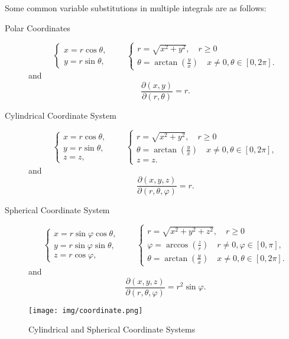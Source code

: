 \documentclass[11pt]{../../TexTemplate/elegantbook}
\begin{document}
\vspace{0.7cm}
Some common variable substitutions in multiple integrals are as follows:
\begin{description}
\item[Polar Coordinates]
\[
\begin{cases} 
    x = r \cos \theta, \\ 
    y = r \sin \theta,
\end{cases}
\qquad
\begin{cases} 
    r = \sqrt{x^2 + y^2},\quad r\geqslant 0 \\ 
    \theta = \arctan\left(\frac{y}{x}\right)\quad x\neq 0, \theta\in [0, 2\pi].
\end{cases}
\]
and
\[
\frac{\partial (x,y)}{\partial (r,\theta)} = r.
\]

\item[Cylindrical Coordinate System]
\[
\begin{cases} 
    x = r \cos \theta, \\ 
    y = r \sin \theta, \\
    z = z,
\end{cases}
\qquad
\begin{cases} 
    r = \sqrt{x^2 + y^2},\quad r\geqslant 0 \\ 
    \theta = \arctan\left(\frac{y}{x}\right)\quad x\neq 0, \theta\in [0, 2\pi], \\
    z = z.
\end{cases}
\]
and
\[
\frac{\partial (x,y,z)}{\partial (r,\theta,\varphi)} = r.
\]

\item[Spherical Coordinate System]
\[
\begin{cases} 
    x = r \sin \varphi \cos \theta, \\ 
    y = r \sin \varphi \sin \theta, \\
    z = r \cos \varphi,
\end{cases}
\qquad
\begin{cases} 
    r = \sqrt{x^2 + y^2 + z^2},\quad r\geqslant 0 \\ 
    \varphi = \arccos\left(\frac{z}{r}\right)\quad r\neq 0, \varphi\in [0, \pi], \\
    \theta = \arctan\left(\frac{y}{x}\right)\quad x\neq 0, \theta\in [0, 2\pi].
\end{cases}
\]
and
\[
\frac{\partial (x,y,z)}{\partial (r,\theta,\varphi)} = r^2 \sin \varphi.
\]

\end{description}
\begin{figure}[h]
    \centering
    \texttt{[image: img/coordinate.png]}
    \caption{Cylindrical and Spherical Coordinate Systems}
\end{figure}
\end{document}
